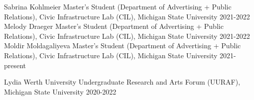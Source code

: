 


\begin{cvhonors}

    \cvhonor
      {Sabrina Kohlmeier} %
    {Master's Student (Department of Advertising + Public Relations), Civic Infrastructure Lab (CIL), Michigan State University} %
    {} %
    {2021-2022} %
  \cvhonor
      {Melody Draeger} %
    {Master's Student (Department of Advertising + Public Relations), Civic Infrastructure Lab (CIL), Michigan State University} %
    {} %
    {2021-2022} %
      \cvhonor
      {Moldir Moldagaliyeva} %
    {Master's Student (Department of Advertising + Public Relations), Civic Infrastructure Lab (CIL), Michigan State University} %
    {} %
    {2021-present} %
    
\cvhonor
    {Lydia Werth} %
    {University Undergraduate Research and Arts Forum (UURAF), Michigan State University} %
    {} %
    {2020-2022} %
\end{cvhonors}
\newpage